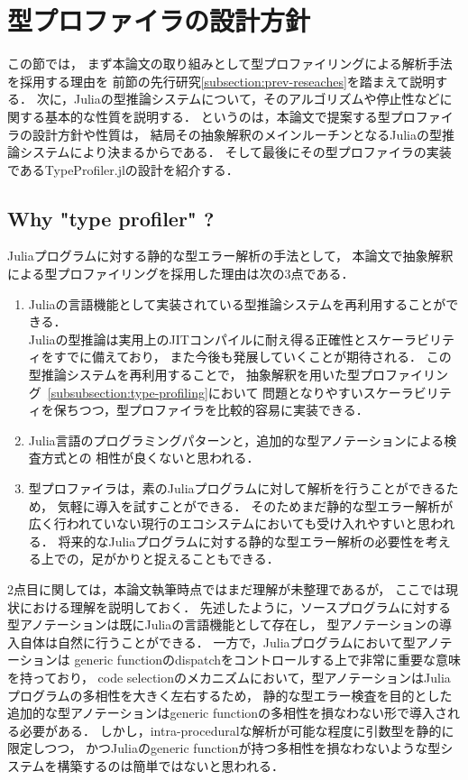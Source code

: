 
\section{型プロファイラの設計方針} \label{section:3}

この節では，
まず本論文の取り組みとして型プロファイリングによる解析手法を採用する理由を
前節の先行研究\ref{subsection:prev-reseaches}を踏まえて説明する．
次に，Juliaの型推論システムについて，そのアルゴリズムや停止性などに関する基本的な性質を説明する．
というのは，本論文で提案する型プロファイラの設計方針や性質は，
結局その抽象解釈のメインルーチンとなるJuliaの型推論システムにより決まるからである．
そして最後にその型プロファイラの実装であるTypeProfiler.jlの設計を紹介する．

\subsection{Why "type profiler" ?}

Juliaプログラムに対する静的な型エラー解析の手法として，
本論文で抽象解釈による型プロファイリングを採用した理由は次の3点である．

\begin{enumerate}
  \item Juliaの言語機能として実装されている型推論システムを再利用することができる．\\
        Juliaの型推論は実用上のJITコンパイルに耐え得る正確性とスケーラビリティをすでに備えており，
        また今後も発展していくことが期待される．
        この型推論システムを再利用することで，
        抽象解釈を用いた型プロファイリング~\ref{subsubsection:type-profiling}において
        問題となりやすいスケーラビリティを保ちつつ，型プロファイラを比較的容易に実装できる．
　\item Julia言語のプログラミングパターンと，追加的な型アノテーションによる検査方式との
        相性が良くないと思われる．
  \item 型プロファイラは，素のJuliaプログラムに対して解析を行うことができるため，
        気軽に導入を試すことができる．
        そのためまだ静的な型エラー解析が広く行われていない現行のエコシステムにおいても受け入れやすいと思われる．
        将来的なJuliaプログラムに対する静的な型エラー解析の必要性を考える上での，足がかりと捉えることもできる．
\end{enumerate}

2点目に関しては，本論文執筆時点ではまだ理解が未整理であるが，
ここでは現状における理解を説明しておく．
先述したように，ソースプログラムに対する型アノテーションは既にJuliaの言語機能として存在し，
型アノテーションの導入自体は自然に行うことができる．
一方で，Juliaプログラムにおいて型アノテーションは
generic functionのdispatchをコントロールする上で非常に重要な意味を持っており，
code selectionのメカニズムにおいて，型アノテーションはJuliaプログラムの多相性を大きく左右する\footnotemark ため，
静的な型エラー検査を目的とした追加的な型アノテーションはgeneric functionの多相性を損なわない形で導入される必要がある．
しかし，intra-proceduralな解析が可能な程度に引数型を静的に限定しつつ，
かつJuliaのgeneric functionが持つ多相性を損なわないような型システムを構築するのは簡単ではないと思われる．

